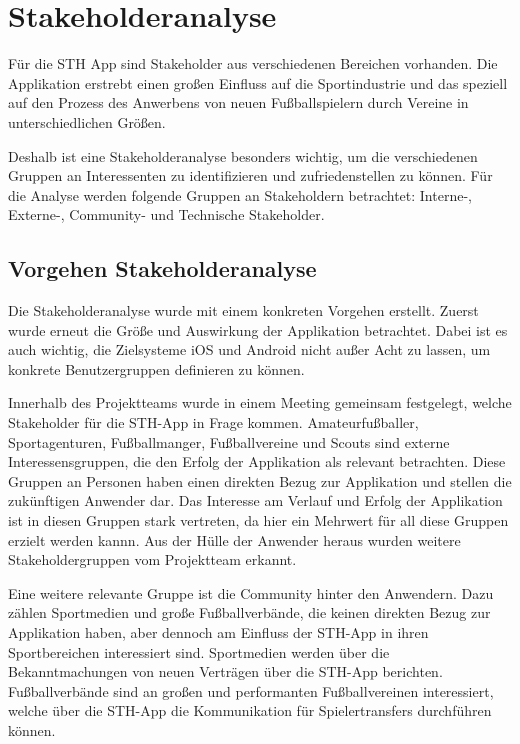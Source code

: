 \chapter{Stakeholderanalyse}

Für die STH App sind Stakeholder aus verschiedenen Bereichen vorhanden.
Die Applikation erstrebt einen großen Einfluss auf die Sportindustrie und das speziell auf den Prozess des Anwerbens von neuen Fußballspielern durch Vereine in unterschiedlichen Größen.

\noindent
Deshalb ist eine Stakeholderanalyse besonders wichtig, um die verschiedenen Gruppen an Interessenten zu identifizieren und zufriedenstellen zu können.
Für die Analyse werden folgende Gruppen an Stakeholdern betrachtet: Interne-, Externe-, Community- und Technische Stakeholder.

\section{Vorgehen Stakeholderanalyse}

Die Stakeholderanalyse wurde mit einem konkreten Vorgehen erstellt.
Zuerst wurde erneut die Größe und Auswirkung der Applikation betrachtet.
Dabei ist es auch wichtig, die Zielsysteme iOS und Android nicht außer Acht zu lassen, um konkrete Benutzergruppen definieren zu können.

\noindent
Innerhalb des Projektteams wurde in einem Meeting gemeinsam festgelegt, welche Stakeholder für die STH-App in Frage kommen.
Amateurfußballer, Sportagenturen, Fußballmanger, Fußballvereine und Scouts sind externe Interessensgruppen, die den Erfolg der Applikation als relevant betrachten.
Diese Gruppen an Personen haben einen direkten Bezug zur Applikation und stellen die zukünftigen Anwender dar.
Das Interesse am Verlauf und Erfolg der Applikation ist in diesen Gruppen stark vertreten, da hier ein Mehrwert für all diese Gruppen erzielt werden kannn.
Aus der Hülle der Anwender heraus wurden weitere Stakeholdergruppen vom Projektteam erkannt.

\noindent
Eine weitere relevante Gruppe ist die Community hinter den Anwendern.
Dazu zählen Sportmedien und große Fußballverbände, die keinen direkten Bezug zur Applikation haben, aber dennoch am Einfluss der STH-App in ihren Sportbereichen interessiert sind.
Sportmedien werden über die Bekanntmachungen von neuen Verträgen über die STH-App berichten.
Fußballverbände sind an großen und performanten Fußballvereinen interessiert, welche über die STH-App die Kommunikation für Spielertransfers durchführen können.

